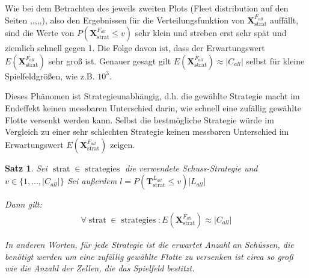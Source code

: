\documentclass[a4paper,12pt]{llncs}
\numberwithin{equation}{section}
\newtheorem{satz}{Satz}
\DeclareMathOperator{\strat}{strat}
\DeclareMathOperator{\strategies}{strategies}
\begin{document}
\begin{landscape}
	
	\label{fig:compare1}
\end{landscape}

\begin{landscape}
	
	\label{fig:compare2}
\end{landscape}

\begin{landscape}
	
	\label{fig:compare3}
\end{landscape}

Wie bei dem Betrachten des jeweils zweiten Plots (Fleet distribution auf den Seiten \pageref{fig:random1},\pageref{fig:fullGrid1},\pageref{fig:sparseGrid1},\pageref{fig:halton1},\pageref{fig:sobol1},\pageref{fig:compare1}), also den Ergebnissen für die Verteilungsfunktion von $\mathbf{X}^{F_{all}}_{\strat}$ auffällt, sind die Werte von $P(\mathbf{X}^{F_{all}}_{\strat} \leq v)$ sehr klein und streben erst sehr spät und ziemlich schnell gegen 1. Die Folge davon ist, dass der Erwartungswert $E(\mathbf{X}^{F_{all}}_{\strat})$ sehr groß ist. Genauer gesagt gilt $E(\mathbf{X}^{F_{all}}_{\strat}) \approx |C_{all}|$ selbst für kleine Spielfeldgrößen, wie z.B. $10^3$.

Dieses Phänomen ist Strategieunabhängig, d.h. die gewählte Strategie macht im Endeffekt keinen messbaren Unterschied darin, wie schnell eine zufällig gewählte Flotte versenkt werden kann. Selbst die bestmögliche Strategie würde im Vergleich zu einer sehr schlechten Strategie keinen messbaren Unterschied im Erwartungswert $E(\mathbf{X}^{F_{all}}_{\strat})$ zeigen.

\begin{satz}
Sei $\strat \in \strategies$ die verwendete Schuss-Strategie und $v \in \{1, \dots, |C_{all}|\}$
Sei außerdem $l=P(\mathbf{T}^{L_{all}}_{\strat} \leq v) |L_{all}|$

Dann gilt:
\begin{align}
\forall \strat \in \strategies \colon E(\mathbf{X}^{F_{all}}_{\strat}) \approx |C_{all}|
\nonumber
\end{align}

In anderen Worten, für jede Strategie ist die erwartet Anzahl an Schüssen, die benötigt werden um eine zufällig gewählte Flotte zu versenken ist circa so groß wie die Anzahl der Zellen, die das Spielfeld bestitzt.
\end{satz}
\end{document}
